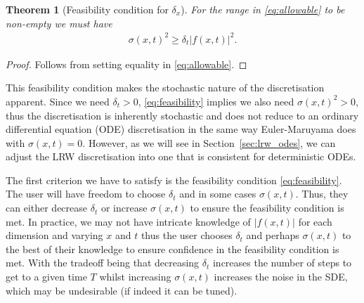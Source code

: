 \documentclass[pra,showpacs,amsmath,amssymb,amsfonts,lengthcheck,longbibliography,onecolumn]{revtex4-2}
\newtheorem{theorem}{Theorem}
\begin{document}
\begin{theorem}[Feasibility condition for $\delta_x$]
    For the range in \eqref{eq:allowable} to be non-empty we must have
    \begin{align}\label{eq:feasibility}
    \sigma(x,t)^2 \geq \delta_t |f(x,t)|^2.
    \end{align}
\end{theorem}
\begin{proof}
    Follows from setting equality in \eqref{eq:allowable}.
\end{proof}

This feasibility condition makes the stochastic nature of the discretisation apparent.
Since we need $\delta_t > 0$, \eqref{eq:feasibility} implies we also need
$\sigma(x,t)^2 > 0$, thus the discretisation is inherently stochastic and does not
reduce to an ordinary differential equation (ODE) discretisation in the same way
Euler-Maruyama does with $\sigma(x,t)=0$.
However, as we will see in Section~\ref{sec:lrw_odes}, we can adjust
the LRW discretisation into one that is consistent for deterministic ODEs.





The first criterion we have to satisfy is the feasibility condition \eqref{eq:feasibility}. The user will have freedom to choose $\delta_t$ and in some cases $\sigma(x,t)$. Thus, they can either decrease $\delta_t$ or increase $\sigma(x,t)$ to ensure the feasibility condition is met. In practice, we may not have intricate knowledge of $|f(x,t)|$ for each dimension and varying $x$ and $t$ thus the user chooses $\delta_t$ and perhaps $\sigma(x,t)$ to the best of their knowledge to ensure confidence in the feasibility condition is met. With the tradeoff being that decreasing $\delta_t$ increases the number of steps to get to a given time $T$ whilst increasing $\sigma(x,t)$ increases the noise in the SDE, which may be undesirable (if indeed it can be tuned).
\end{document}
